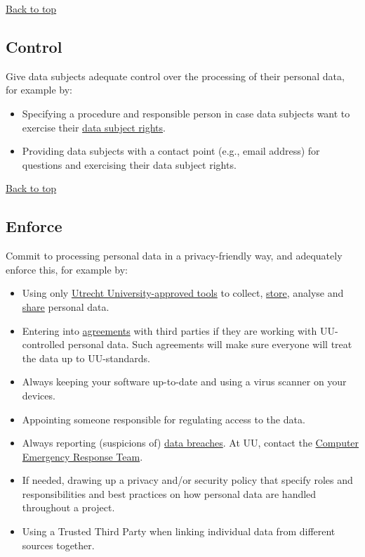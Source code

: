 \documentclass[
]{book}
\providecommand{\tightlist}{%
  \setlength{\itemsep}{0pt}\setlength{\parskip}{0pt}}
\begin{document}
\protect\hyperlink{data-oriented-strategies}{Back to top}

\hypertarget{control}{%
\subsection{\texorpdfstring{ Control}{ Control}}\label{control}}

Give data subjects adequate control over the processing of their personal data,
for example by:

\begin{itemize}
\tightlist
\item
  Specifying a procedure and responsible person in case data subjects want to
  exercise their \protect\hyperlink{data-subject-rights}{data subject rights}.
\item
  Providing data subjects with a contact point (e.g., email address) for
  questions and exercising their data subject rights.
\end{itemize}

\protect\hyperlink{data-oriented-strategies}{Back to top}

\hypertarget{enforce}{%
\subsection{\texorpdfstring{ Enforce}{ Enforce}}\label{enforce}}

Commit to processing personal data in a privacy-friendly way, and adequately
enforce this, for example by:

\begin{itemize}
\tightlist
\item
  Using only \href{https://tools.uu.nl/}{Utrecht University-approved tools}
  to collect, \protect\hyperlink{data-storage}{store}, analyse and \protect\hyperlink{data-sharing-collaboration}{share}
  personal data.
\item
  Entering into \protect\hyperlink{agreements}{agreements} with third parties if they
  are working with UU-controlled personal data. Such agreements will make sure
  everyone will treat the data up to UU-standards.
\item
  Always keeping your software up-to-date and using a virus scanner on your devices.
\item
  Appointing someone responsible for regulating access to the data.
\item
  Always reporting (suspicions of)
  \href{https://intranet.uu.nl/en/knowledgebase/what-is-a-personal-data-breach}{data breaches}.
  At UU, contact the \href{https://intranet.uu.nl/en/security/information-security-computer-misuse-or-report-incident-cert}{Computer Emergency Response Team}.
\item
  If needed, drawing up a privacy and/or security policy that specify roles and
  responsibilities and best practices on how personal data are handled throughout
  a project.
\item
  Using a Trusted Third Party when linking individual data from different
  sources together.
\end{itemize}
\end{document}
